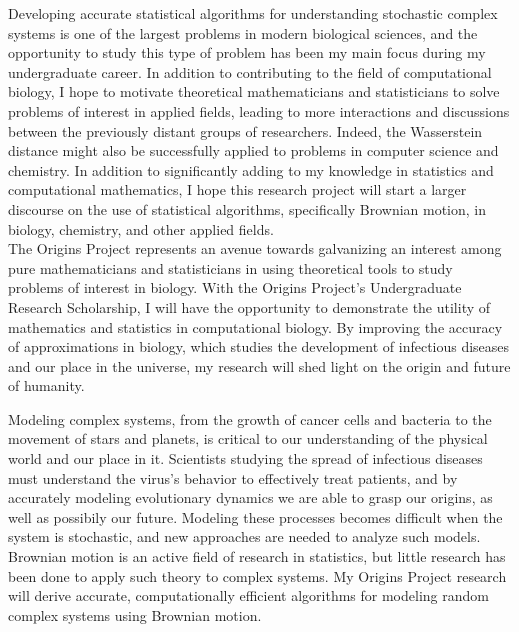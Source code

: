 \documentclass[8 pt, leqno]{article}
\begin{document}
\indent Developing accurate statistical algorithms for understanding stochastic complex systems is one of the largest problems in modern biological sciences, and the opportunity to study this type of problem has been my main focus during my undergraduate career. In addition to contributing to the field of computational biology, I hope to motivate theoretical mathematicians and statisticians to solve problems of interest in applied fields, leading to more interactions and discussions between the previously distant groups of researchers. Indeed, the Wasserstein distance might also be successfully applied to problems in computer science and chemistry. In addition to significantly adding to my knowledge in statistics and computational mathematics, I hope this research project will start a larger discourse on the use of statistical algorithms, specifically Brownian motion, in biology, chemistry, and other applied fields. \\
\indent The Origins Project represents an avenue towards galvanizing an interest among pure mathematicians and statisticians in using theoretical tools to study problems of interest in biology. With the Origins Project’s Undergraduate Research Scholarship, I will have the opportunity to demonstrate the utility of mathematics and statistics in computational biology. By improving the accuracy of approximations in biology, which studies the development of infectious diseases and our place in the universe, my research will shed light on the origin and future of humanity.




 
\newpage 
Modeling complex systems, from the growth of cancer cells and bacteria to the movement of stars and planets, is critical to our understanding of the physical world and our place in it. Scientists studying the spread of infectious diseases must understand the virus's behavior to effectively treat patients, and by accurately modeling evolutionary dynamics we are able to grasp our origins, as well as possibily our future.  Modeling these processes becomes difficult when the system is stochastic, and new approaches are needed to analyze such models. Brownian motion is an active field of research in statistics, but little research has been done to apply such theory to complex systems. My Origins Project research will derive accurate, computationally efficient algorithms for modeling random complex systems using Brownian motion.
\end{document}

